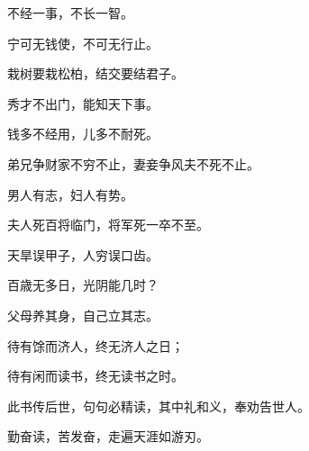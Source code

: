 \documentclass[12pt,oneside]{book}
\begin{document}
不经一事，不长一智。

宁可无钱使，不可无行止。

栽树要栽松柏，结交要结君子。

秀才不出门，能知天下事。

钱多不经用，儿多不耐死。

弟兄争财家不穷不止，妻妾争风夫不死不止。

男人有志，妇人有势。

夫人死百将临门，将军死一卒不至。

天旱误甲子，人穷误口齿。

百歳无多日，光阴能几时？

父母养其身，自己立其志。

待有馀而济人，终无济人之日；

待有闲而读书，终无读书之时。

此书传后世，句句必精读，其中礼和义，奉劝告世人。

勤奋读，苦发奋，走遍天涯如游刃。








\end{document}
